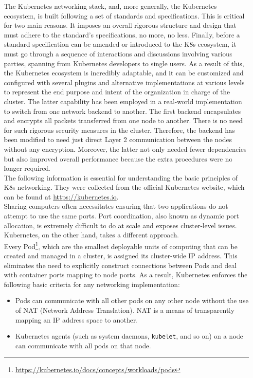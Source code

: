 The Kubernetes networking stack, and, more generally, the Kubernetes ecosystem, is
built following a set of standards and specifications. This is critical for two
main reasons. It imposes an overall rigorous structure and design that must adhere
to the standard's specifications, no more, no less. Finally, before a standard specification
can be amended or introduced to the K8s ecosystem, it must go through a sequence
of interactions and discussions involving various parties, spanning from Kubernetes
developers to single users. As a result of this, the Kubernetes ecosystem is incredibly
adaptable, and it can be customized and configured with several plugins and
alternative implementations at various levels to represent the end purpose and
intent of the organization in charge of the cluster. The latter capability has been
employed in a real-world implementation to switch from one network backend to another.
The first backend encapsulates and encrypts all packets transferred from one
node to another. There is no need for such rigorous security measures in the cluster.
Therefore, the backend has been modified to need just direct Layer 2 communication
between the nodes without any encryption. Moreover, the latter not only needed fewer
dependencies but also improved overall performance because the extra procedures were
no longer required. \\ %
The following information is essential for understanding the basic principles of
K8s networking. They were collected from the official Kubernetes website, which can
be found at \url{https://kubernetes.io}. \\ %
Sharing computers often necessitates ensuring that two applications do not attempt
to use the same ports. Port coordination, also known as dynamic port allocation,
is extremely difficult to do at scale and exposes cluster-level issues. Kubernetes,
on the other hand, takes a different approach. \\ %
Every Pod\footnote{\url{https://kubernetes.io/docs/concepts/workloads/pods}},
which are the smallest deployable units of computing that can be created and
managed in a cluster, is assigned its cluster-wide IP address. This eliminates
the need to explicitly construct connections between Pods and deal with
container ports mapping to node ports. As a result, Kubernetes enforces the
following basic criteria for any networking implementation:
\begin{itemize}
  \item Pods can communicate with all other pods on any other node without the use
    of NAT (Network Address Translation). NAT is a means of transparently
    mapping an IP address space to another\cite{nat}.

  \item Kubernetes agents (such as system daemons, \texttt{kubelet}, and so on)
    on a node can communicate with all pods on that node.
\end{itemize}
